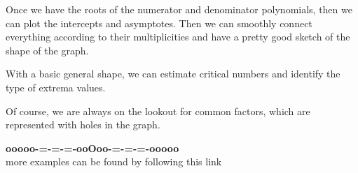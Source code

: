 \documentclass{ximera}
\begin{document}
Once we have the roots of the numerator and denominator polynomials, then we can plot the intercepts and asymptotes.  Then we can smoothly connect everything according to their multiplicities and have a pretty good sketch of the shape of the graph.

With a basic general shape, we can estimate critical numbers and identify the type of extrema values. 

Of course, we are always on the lookout for common factors, which are represented with holes in the graph. 





























\begin{center}
\textbf{\textcolor{green!50!black}{ooooo-=-=-=-ooOoo-=-=-=-ooooo}} \\

more examples can be found by following this link\\ 

\end{center}
\end{document}
